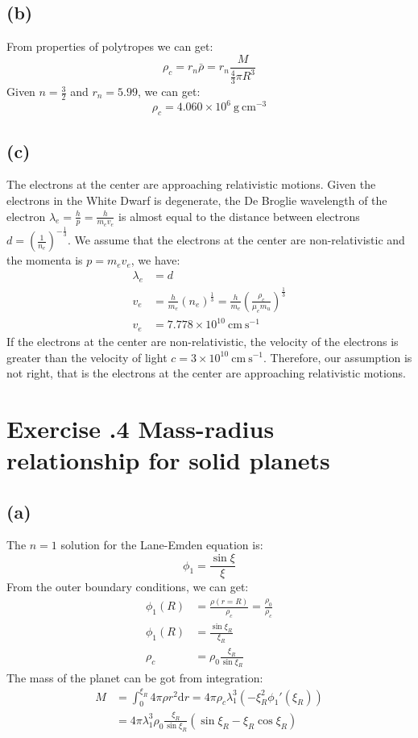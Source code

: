 \documentclass[a4paper,12pt]{article}
\renewcommand{\d}{\mathrm{d}}
\newcommand{\cm}{\mathrm{cm}}
\newcommand{\s}{\mathrm{s}}
\newcommand{\g}{\mathrm{g}}
\begin{document}
\subsection*{(b)}
From properties of polytropes we can get:
\begin{equation*}
    \rho_c = r_n \bar{\rho} = r_n \frac{M}{\frac{4}{3} \pi R^3}
\end{equation*}
Given $n = \frac{3}{2}$ and $r_n = 5.99$, we can get:
\begin{equation*}
    \rho_c = 4.060\times 10^6 \ \g \ \cm^{-3}
\end{equation*}

\subsection*{(c)}
The electrons at the center are approaching relativistic motions. 
Given the electrons in the White Dwarf is degenerate, 
the De Broglie wavelength of the electron $\lambda_e = \frac{h}{p} = \frac{h}{m_e v_e}$
is almost equal to the distance between electrons $d = (\frac{1}{n_e})^{-\frac{1}{3}}$. 
We assume that the electrons at the center are non-relativistic and the momenta is 
$p = m_e v_e$, we have:
\begin{align*}
    \lambda_e &= d \\
    v_e &= \frac{h}{m_e} (n_e)^{\frac{1}{3}} = \frac{h}{m_e} (\frac{\rho_c}{\mu_e m_u})^{\frac{1}{3}} \\
    v_e &= 7.778\times 10^{10} \ \cm \ \s^{-1}
\end{align*}
If the electrons at the center are non-relativistic, the velocity of the electrons is greater than 
the velocity of light $c=3\times 10^{10}\ \cm \ \s^{-1} $.
Therefore, our assumption is not right, that is the electrons at the center are approaching relativistic motions.

\section*{\textbf{Exercise \uppercase\expandafter{}.4 Mass-radius relationship for solid planets}}
\subsection*{(a)}
The $n=1$ solution for the Lane-Emden equation is:
\begin{equation*}
    \phi_1 = \frac{\sin \xi}{\xi}
\end{equation*}
From the outer boundary conditions, we can get:
\begin{align*}
    \phi_1(R) &= \frac{\rho(r=R)}{\rho_c} = \frac{\rho_0}{\rho_c} \\
    \phi_1(R) &= \frac{\sin \xi_R}{\xi_R} \\
    \rho_c &= \rho_0 \frac{\xi_R}{\sin \xi_R}
\end{align*}
The mass of the planet can be got from integration:
\begin{align*}
    M &= \int_{0}^{\xi_R} 4\pi \rho r^2 \d r = 4\pi \rho_c \lambda_1^3 (-\xi_R^2 \phi_1'(\xi_R)) \\
    &= 4\pi \lambda_1^3 \rho_0 \frac{\xi_R}{\sin \xi_R} (\sin \xi_R - \xi_R\cos \xi_R)
\end{align*}
\end{document}
